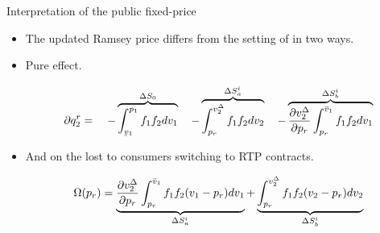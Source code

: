 \documentclass{class}
\begin{document}
\begin{frame}{Interpretation of the public fixed-price}\label{RamseyPrices}

\begin{itemize}

\item The updated Ramsey price differs from the setting of \cite{joskow2006retail} in two ways. \hyperlink{ramsey_init}{}

\vfill

\item Pure  effect. \vfill

\begin{equation*}
 \partial q_2^r = \quad - \overbrace{\int_{\ubar{v}_1}^{p_1}f_1 f_2 dv_1}^{\Delta S_0} \quad - \overbrace{\int_{p_r}^{v^{\Delta}_2} f_1 f_2 dv_2}^{\Delta S_a^i} \quad - \overbrace{\pdv{v^{\Delta}_2}{p_r} \int_{p_r}^{\bar{v}_1}f_1 f_2 dv_1}^{\Delta S_b^i} 
\end{equation*}

\vfill

\item And on the  lost to consumers switching to RTP contracts. \vfill

\begin{equation*}
\Omega(p_r) = \displaystyle \underbrace{ \pdv{v^{\Delta}_2}{p_r}  \int_{p_r}^{\bar{v}_1} f_1 f_2 ( v_1 - p_r) dv_1}_{\Delta S_a^i} + \underbrace{\int_{p_r}^{v^{\Delta}_2} f_1 f_2 ( v_2 - p_r) dv_2}_{\Delta S_b^i} 
\end{equation*}


\end{itemize}

    \hyperlink{RamseyOutside}{} 

\end{frame}



    
\end{document}

